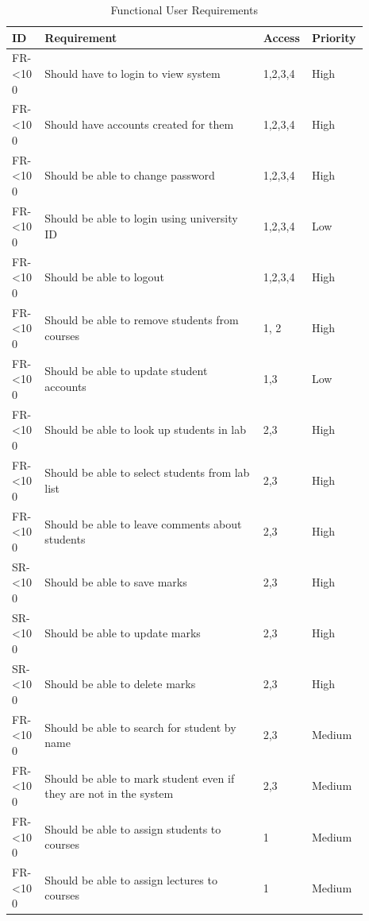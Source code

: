 \documentclass[12pt]{article}  %
\newcommand{\rid}[1]{\centering #1-\ifnum\value{requirement}<10 0\fi\arabic{requirement} \stepcounter{requirement}}
\begin{document}
\begin{spacing}{1.5}
\begin{longtable}{|p{0.09\linewidth}|p{0.6\linewidth}|p{0.1\linewidth}|
p{0.1\linewidth}|}
\caption{Functional User Requirements} \label{table:funct-user} \\ \hline
\textbf{ID} & \textbf{Requirement} & \textbf{Access} & \textbf{Priority}\\
\hline \hline

\rid{FR} & Should have to login to view system & 1,2,3,4 & High\\ \hline
\rid{FR} & Should have accounts created for them & 1,2,3,4 & High\\ \hline
\rid{FR} & Should be able to change password & 1,2,3,4 & High\\ \hline
\rid{FR} & Should be able to login using university ID & 1,2,3,4 & Low\\ \hline
\rid{FR} & Should be able to logout & 1,2,3,4 & High \\ \hline

\rid{FR} & Should be able to remove students from courses & 1, 2 & High\\ \hline
\rid{FR} & Should be able to update student accounts & 1,3 & Low \\ \hline

\rid{FR} & Should be able to look up students in lab & 2,3 & High\\ \hline
\rid{FR} & Should be able  to select students from lab list & 2,3 & High\\ \hline
\rid{FR} & Should be able to leave comments about students & 2,3 & High\\ \hline
\rid{SR} & Should be able to save marks & 2,3 & High\\ \hline
\rid{SR} & Should be able to update marks & 2,3 & High\\ \hline
\rid{SR} & Should be able to delete marks & 2,3 & High\\ \hline
\rid{FR} & Should be able to search for student by name & 2,3 & Medium\\ \hline
\rid{FR} & Should be able to mark student even if they are not in the system & 2,3 & Medium \\ \hline

\rid{FR} & Should be able to assign students to courses & 1 & Medium\\ \hline
\rid{FR} & Should be able to assign lectures to courses & 1 & Medium \\ \hline


\end{longtable}
\end{spacing}
\end{document}
